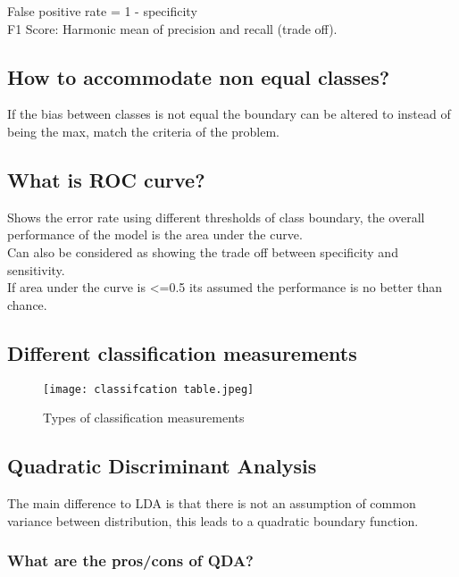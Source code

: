 \documentclass[11pt]{scrartcl} %
\begin{document}
False positive rate = 1 - specificity\\

F1 Score: Harmonic mean of precision and recall (trade off).
\subsection{How to accommodate non equal classes?}

If the bias between classes is not equal the boundary can be altered to instead of being the max,
match the criteria of the problem.

\subsection{What is ROC curve?}

Shows the error rate using different thresholds of class boundary, the overall performance of the model is the
area under the curve.\\

Can also be considered as showing the trade off between specificity and sensitivity.\\

If area under the curve is <=0.5 its assumed the performance is no better than chance.

\subsection{Different classification measurements}

\begin{figure}[h] %
	\centering
	\texttt{[image: classifcation table.jpeg]} %
	\caption{Types of classification measurements}
\end{figure}

\subsection{Quadratic Discriminant Analysis}

The main difference to LDA is that there is not an assumption of common variance between distribution,
this leads to a quadratic boundary function. 

\subsubsection{What are the pros/cons of QDA?}
\end{document}
